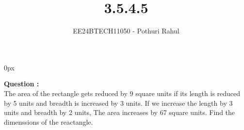 \documentclass[journal]{IEEEtran}
\begin{document}

\vspace{3cm}
\parindent 0px

\title{3.5.4.5}
\author{EE24BTECH11050 - Pothuri Rahul}
{\let\newpage\relax\maketitle}

\renewcommand{\thefigure}{\theenumi}
\renewcommand{\thetable}{\theenumi}
\setlength{\intextsep}{10pt} %


\renewcommand{\thetable}{\theenumi}

\textbf{Question :} \\ 
The area of the rectangle gets reduced by 9 square units if its length is reduced by 5 units and breadth is increased by 3 units. If we increase the length by 3 units and breadth by 2 units, The area increases by 67 square units. Find the dimenssions of the reactangle.
\solution \\

\begin{figure}[!ht]
\centering
{}%
\end{figure}
\end{document}
